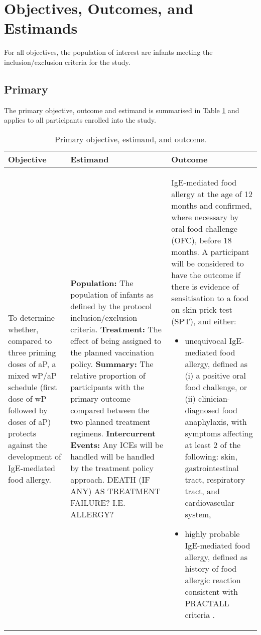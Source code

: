 \documentclass{bmcart}
\begin{document}
\section*{Objectives, Outcomes, and Estimands}

For all objectives, the population of interest are infants meeting the inclusion/exclusion criteria for the study.

\subsection*{Primary}

The primary objective, outcome and estimand is summarised in Table \ref{tab:objective-estimands-outcomes-primary} and applies to all participants enrolled into the study.

\begin{table}[!ht]
	\caption{Primary objective, estimand, and outcome.}
	\label{tab:objective-estimands-outcomes-primary}
	\begin{tabular}{p{3cm}p{4.25cm}p{4.25cm}}
		Objective & Estimand & Outcome \\ \hline
		To determine whether, compared to three priming doses of aP, a mixed wP/aP schedule (first dose of wP followed by doses of aP) protects against the development of IgE-mediated food allergy.
	& \textbf{Population:} The population of infants as defined by the protocol inclusion/exclusion criteria. \newline 
	\textbf{Treatment:} The effect of being assigned to the planned vaccination policy. \newline 
	\textbf{Summary:} The relative proportion of participants with the primary outcome compared between the two planned treatment regimens. \newline
	\textbf{Intercurrent Events:} Any ICEs will be handled will be handled by the treatment policy approach. DEATH (IF ANY) AS TREATMENT FAILURE? I.E. ALLERGY?
		&
		IgE-mediated food allergy at the age of 12 months and confirmed, where necessary by oral food challenge (OFC), before 18 months.
		A participant will be considered to have the outcome if there is evidence of sensitisation to a food on skin prick test (SPT), and either:
		\begin{itemize}
			\item unequivocal IgE-mediated food allergy, defined as (i) a positive oral food challenge, or (ii) clinician-diagnosed food anaphylaxis, with symptoms affecting at least 2 of the following: skin, gastrointestinal tract, respiratory tract, and cardiovascular system,
			\item highly probable IgE-mediated food allergy, defined as history of food allergic reaction consistent with PRACTALL criteria \cite{sampson2012standardizing}.
		\end{itemize} \\
		\hline
	\end{tabular}
\end{table}
\end{document}
